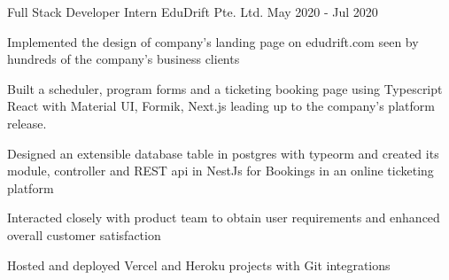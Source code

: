 \begin{cventries}
  \cventry
    {Full Stack Developer Intern} %
    {EduDrift Pte. Ltd.} %
    {} %
    {May 2020 - Jul 2020} %
    {
      \begin{cvitems} %
        \item {Implemented the design of company's landing page on \textcolor{eduDft-darkblue}{edudrift.com} seen by hundreds of the company's business clients}
        \item {Built a scheduler, program forms and a ticketing booking page using Typescript React with Material UI, Formik, Next.js leading up to the company's platform release.}
        \item {Designed an extensible database table in postgres with typeorm and created its module, controller and REST api in NestJs for Bookings in an online ticketing platform}
        \item {Interacted closely with product team to obtain user requirements and enhanced overall customer satisfaction}
        \item {Hosted and deployed Vercel and Heroku projects with Git integrations}
      \end{cvitems}
    }

\end{cventries}
